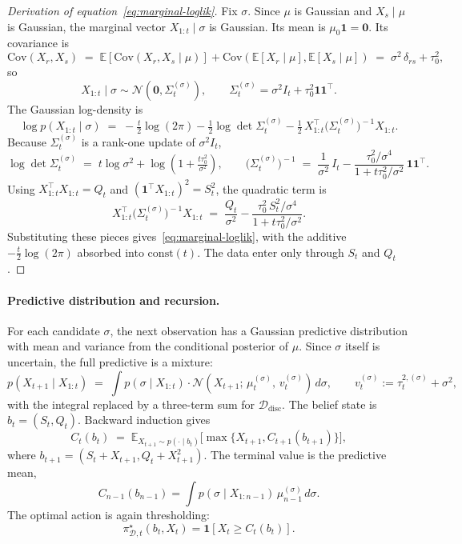 \documentclass[11pt]{article}
\begin{document}
\begin{proof}[Derivation of equation~\eqref{eq:marginal-loglik}]\label{app:marginal-derivation}
Fix \(\sigma\). Since \(\mu\) is Gaussian and \(X_s\mid\mu\) is Gaussian, the marginal vector \(X_{1:t}\mid\sigma\) is Gaussian. Its mean is \(\mu_0\mathbf{1}=\mathbf{0}\). Its covariance is
\[
\mathrm{Cov}(X_r, X_s) \;=\; \mathbb{E}[\mathrm{Cov}(X_r, X_s \mid \mu)] + \mathrm{Cov}(\mathbb{E}[X_r \mid \mu], \mathbb{E}[X_s \mid \mu]) \;=\; \sigma^2\,\delta_{rs} + \tau_0^2,
\]
so
\[
X_{1:t}\mid\sigma\sim\mathcal{N}\!\left(\mathbf{0},\Sigma_t^{(\sigma)}\right),
\qquad
\Sigma_t^{(\sigma)}=\sigma^2I_t+\tau_0^2\mathbf{1}\mathbf{1}^\top .
\]
The Gaussian log-density is
\[
\log p(X_{1:t} \mid \sigma) \;=\; -\tfrac{t}{2}\log(2\pi) - \tfrac{1}{2}\log\det\Sigma_t^{(\sigma)} - \tfrac{1}{2}\, X_{1:t}^\top \big(\Sigma_t^{(\sigma)}\big)^{\!-1} X_{1:t}.
\]
Because \(\Sigma_t^{(\sigma)}\) is a rank-one update of \(\sigma^2I_t\),
\[
\log\det\Sigma_t^{(\sigma)} \;=\; t\log\sigma^2 + \log\!\left(1 + \tfrac{t\tau_0^2}{\sigma^2}\right),
\qquad
\big(\Sigma_t^{(\sigma)}\big)^{\!-1} \;=\; \frac{1}{\sigma^2}\, I_t - \frac{\tau_0^2/\sigma^4}{1 + t\tau_0^2/\sigma^2}\,\mathbf{1}\mathbf{1}^\top.
\]
Using \(X_{1:t}^\top X_{1:t}=Q_t\) and \((\mathbf{1}^\top X_{1:t})^2=S_t^2\), the quadratic term is
\[
X_{1:t}^\top \big(\Sigma_t^{(\sigma)}\big)^{\!-1} X_{1:t} \;=\; \frac{Q_t}{\sigma^2} - \frac{\tau_0^2\, S_t^2/\sigma^4}{1 + t\tau_0^2/\sigma^2}.
\]
Substituting these pieces gives~\eqref{eq:marginal-loglik}, with the additive \(-\tfrac{t}{2}\log(2\pi)\) absorbed into \(\mathrm{const}(t)\). The data enter only through \(S_t\) and \(Q_t\).
\end{proof}

\paragraph{Predictive distribution and recursion.}
For each candidate \(\sigma\), the next observation has a Gaussian predictive distribution with mean and variance from the conditional posterior of \(\mu\). Since \(\sigma\) itself is uncertain, the full predictive is a mixture:
\begin{equation}
\label{eq:predictive}
p(X_{t+1} \mid X_{1:t}) \;=\; \int p(\sigma \mid X_{1:t}) \cdot \mathcal{N}\!\left(X_{t+1};\, \mu_t^{(\sigma)},\, v_t^{(\sigma)}\right)\, d\sigma,
\qquad v_t^{(\sigma)} := \tau_t^{2,(\sigma)} + \sigma^2,
\end{equation}
with the integral replaced by a three-term sum for \(\mathcal{D}_{\mathrm{disc}}\). The belief state is \(b_t=(S_t,Q_t)\). Backward induction gives
\begin{equation}
\label{eq:Crec-random}
C_t(b_t) \;=\; \mathbb{E}_{X_{t+1} \sim p(\cdot \mid b_t)}\!\big[\max\{X_{t+1}, C_{t+1}(b_{t+1})\}\big],
\end{equation}
where \(b_{t+1}=(S_t+X_{t+1},Q_t+X_{t+1}^2)\). The terminal value is the predictive mean,
\[
C_{n-1}(b_{n-1})
=
\int p(\sigma\mid X_{1:n-1})\,\mu_{n-1}^{(\sigma)}\,d\sigma .
\]
The optimal action is again thresholding:
\[
\pi^\star_{\mathcal{D},t}(b_t,X_t)=\mathbf{1}[X_t\ge C_t(b_t)] .
\]
\end{document}
